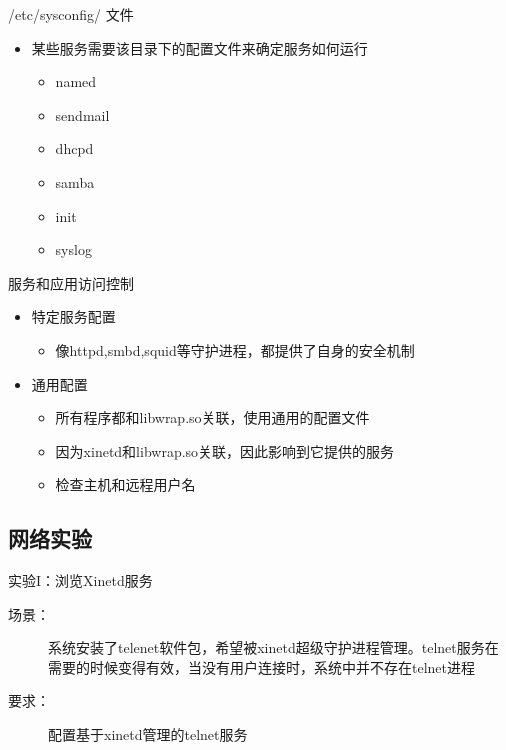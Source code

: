 \begin{frame}{/etc/sysconfig/ 文件}
\begin{itemize}
\item 某些服务需要该目录下的配置文件来确定服务如何运行

\begin{itemize}
\item named
\item sendmail
\item dhcpd
\item samba
\item init
\item syslog
\end{itemize}
\end{itemize}

\end{frame} 
\begin{frame}{服务和应用访问控制}
\begin{itemize}
\item 特定服务配置

\begin{itemize}
\item 像httpd,smbd,squid等守护进程，都提供了自身的安全机制
\end{itemize}
\item 通用配置

\begin{itemize}
\item 所有程序都和libwrap.so关联，使用通用的配置文件
\item 因为xinetd和libwrap.so关联，因此影响到它提供的服务
\item 检查主机和远程用户名
\end{itemize}
\end{itemize}

\end{frame} 
\subsection{网络实验}


\begin{frame}{实验I：浏览Xinetd服务}
\begin{description}
\item [{场景：}] 系统安装了telenet软件包，希望被xinetd超级守护进程管理。telnet服务在需要的时候变得有效，当没有用户连接时，系统中并不存在telnet进程
\item [{要求：}] 配置基于xinetd管理的telnet服务
\end{description}

\end{frame} 
